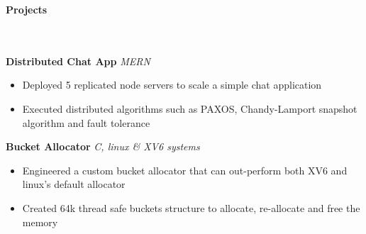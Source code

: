 \documentclass[]{article}
\newcommand{\lineunder} {
    \vspace*{-8pt} \\
    \hrulefill \\
}
\newcommand{\header} [1] {
    {\vspace*{6pt} \fontsize{12}{12}\selectfont \textbf{#1}}
     \lineunder
}
\begin{document}
\vspace{-3mm}
\header{Projects}
\vspace{1mm}
{\hspace{2mm}\textbf{Distributed Chat App}} {\sl MERN} \\
\vspace{-3mm}
\begin{itemize}
        \setlength\itemsep{-1mm}
        \item Deployed 5 replicated node servers to scale a simple chat application
        \item Executed distributed algorithms such as PAXOS, Chandy-Lamport snapshot algorithm and fault tolerance
\end{itemize}

\vspace{-2mm}
{\hspace{2mm}\textbf{Bucket Allocator}} {\sl C, linux \& XV6 systems} \\
\vspace{-3mm}
\begin{itemize}
        \setlength\itemsep{-1mm}
        \item Engineered a custom bucket allocator that can out-perform both XV6 and linux's default allocator
        \item Created 64k thread safe buckets structure to allocate, re-allocate and free the memory
\end{itemize}
\end{document}

